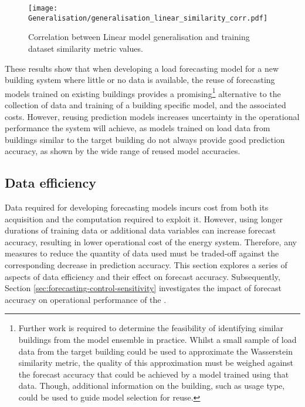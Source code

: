 \begin{figure}[h]
    \centering
    \texttt{[image: Generalisation/generalisation\_linear\_similarity\_corr.pdf]}
    \caption{Correlation between Linear model generalisation and training dataset similarity metric values.}
    \label{fig:forecasting-generalisation-linear-Wass-corr}
\end{figure}

These results show that when developing a load forecasting model for a new building system where little or no data is available, the reuse of forecasting models trained on existing buildings provides a promising\footnote{Further work is required to determine the feasibility of identifying similar buildings from the model ensemble in practice. Whilst a small sample of load data from the target building could be used to approximate the Wasserstein similarity metric, the quality of this approximation must be weighed against the forecast accuracy that could be achieved by a model trained using that data. Though, additional information on the building, such as usage type, could be used to guide model selection for reuse.} alternative to the collection of data and training of a building specific model, and the associated costs. However, reusing prediction models increases uncertainty in the operational performance the  system will achieve, as models trained on load data from buildings similar to the target building do not always provide good prediction accuracy, as shown by the wide range of reused model accuracies.


\newpage
\subsection{Data efficiency} \label{sec:forecasting-data-efficiency}


Data required for developing forecasting models incurs cost from both its acquisition and the computation required to exploit it. However, using longer durations of training data or additional data variables can increase forecast accuracy, resulting in lower operational cost of the energy system. Therefore, any measures to reduce the quantity of data used must be traded-off against the corresponding decrease in prediction accuracy. This section explores a series of aspects of data efficiency and their effect on forecast accuracy. Subsequently, Section \ref{sec:forecasting-control-sensitivity} investigates the impact of forecast accuracy on operational performance of the .


